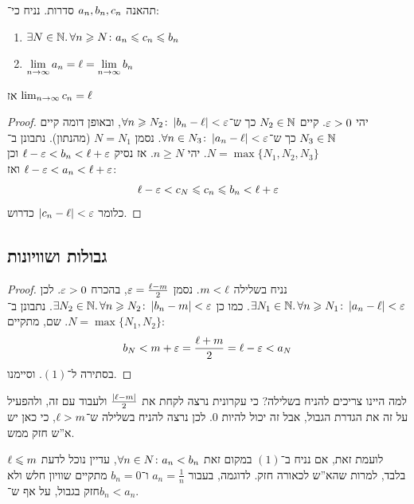 \documentclass[name=רשימות חשבון דיפרנציאלי ואינטגרלי 1א]{../../../tex/classes/megasumPreamble}
\newcommand\limcsi  {\limsi c_n}
\begin{document}
	\begin{Theorem}
		תהאנה $a_n, b_n, c_n$ סדרות. נניח כי־:
		\begin{enumerate}
			\item \hfil $\exists N \in \mathbb{N} .\,\forall n \geqslant N \colon a_n \leqslant c_n \leqslant b_n$
			\item \hfil $\displaystyle \lim_{n \to \infty} a_n = \ell  = \lim_{n \to \infty} b_n$
		\end{enumerate}
		אז $\limcsi = \ml$
	\end{Theorem}
	\begin{proof}
		יהי $\eg > 0$. קיים $N_2 \in \mathbb{N}$ כך ש־$\forall n \ge N_2 \co \sof{b_n - \ml} < \eg$, ובאופן דומה קיים $N_3 \in \mathbb{N}$ כך ש־$\forall n \in N_3\co \sof{a_n - \ml} < \eg$. נסמן $N = N_1$ (מהנתון). נתבונן ב־$N = \max\{N_1, N_2, N_3\}$. יהי $n \ge N$. אז נסיק $\ml - \eg < b_n < \ml + \eg$ וכן $\ml - \eg < a_n < \ml + \eg$ ואז:
		\[ \ml - \eg < c_N \le c_n \le b_n < \ml + \eg \]
		כלומר $\sof{c_n - \ml} < \eg$ כדרוש.
	\end{proof}

	\subsection{גבולות ושוויונות}
	\begin{proof}
		נניח בשלילה $m < \ell$. נסמן $\eg = \frac{\ml - m}{2}$, בהכרח $\eg > 0$. לכן $\exists N_1 \in \N.\, \forall n \ge N_1 \co \sof{a_n - \ml} < \eg$. כמו כן $\exists N_2 \in \N.\, \forall n \ge N_2 \co \sof{b_n - m} < \eg$. נתבונן ב־$N = \max\{N_1, N_2\}$. שם, מתקיים:
		\[ b_N < m + \eg = \frac{\ml + m}{2} = \ml - \eg < a_N \]
		בסתירה ל־$(1)$. וסיימנו.
	\end{proof}
	למה היינו צריכים להניח בשלילה? כי עקרונית נרצה לקחת את $\frac{\left \lvert \ell - m \right \rvert}{2}$ ולעבוד עם זה, ולהפעיל על זה את הגדרת הגבול, אבל זה יכול להיות $0$. לכן נרצה להניח בשלילה ש־$\ell > m$, כי כאן יש א''ש חזק ממש.

	לועמת זאת, אם נניח ב־$(1)$ במקום זאת $\forall n \in N \colon a_n < b_n$, עדיין נוכל לדעת $\ell \leqslant m$ בלבד, למרות שהא''ש לכאורה חזק. לדוגמה, בעבור $a_n = \frac{1}{n}$ ו־$b_n = 0$ מתקיים שוויון חלש ולא חזק בגבול, על אף ש־$b_n < a_n$.
\end{document}
